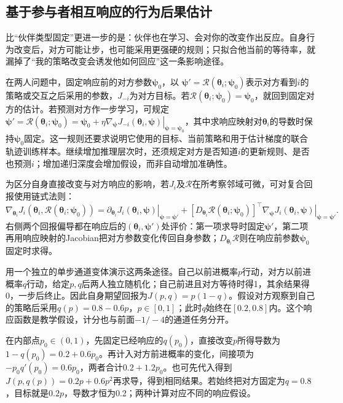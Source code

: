 \subsection{基于参与者相互响应的行为后果估计}
\label{sec:rl-multi-agent-response-model}

比“伙伴类型固定”更进一步的是：伙伴也在学习、会对你的改变作出反应。自身行为改变后，对方可能让步，也可能采用更强硬的规则；只拟合他当前的等待率，就漏掉了“我的策略改变会诱发他如何回应”这一条影响途径。

在两人问题中，固定响应前的对方参数$\bm\psi_0$，以
$\bm\psi'=\mathcal R(\bm\theta_i;\bm\psi_0)$表示对方看到$i$的策略或交互之后采用的参数，$J_{-i}$为对方目标。若$\mathcal R(\bm\theta_i;\bm\psi_0)=\bm\psi_0$，就回到固定对方的估计。若预测对方作一步学习，可规定
$\bm\psi'=\mathcal R(\bm\theta_i;\bm\psi_0)
=\bm\psi_0+\eta\left.\nabla_{\bm\psi}J_{-i}(\bm\theta_i,\bm\psi)\right|_{\bm\psi=\bm\psi_0}$，其中求响应映射对$\bm\theta_i$的导数时保持$\bm\psi_0$固定。这一规则还要求说明它使用的目标、当前策略和用于估计梯度的联合轨迹训练样本。继续增加推理层次时，还须规定对方是否知道$i$的更新规则、是否也预测$i$；增加递归深度会增加假设，而非自动增加准确性。

为区分自身直接改变与对方响应的影响，若$J_i$及$\mathcal R$在所考察邻域可微，可对复合回报使用链式法则：
\begin{equation}
 \nabla_{\bm\theta_i}J_i(\bm\theta_i,\mathcal R(\bm\theta_i;\bm\psi_0))
 =
 \left.\partial_{\bm\theta_i}J_i(\bm\theta_i,\bm\psi)
       \right|_{\bm\psi=\bm\psi'}
 +[D_{\bm\theta_i}\mathcal R(\bm\theta_i;\bm\psi_0)]^\top
 \left.\nabla_{\bm\psi}J_i(\bm\theta_i,\bm\psi)
       \right|_{\bm\psi=\bm\psi'}.
 \label{eq:rl-multi-agent-response-gradient}
\end{equation}
右侧两个回报偏导都在响应后的$(\bm\theta_i,\bm\psi')$处评价：第一项求导时固定$\bm\psi'$，第二项再用响应映射的Jacobian把对方参数变化传回自身参数；$D_{\bm\theta_i}\mathcal R$则在响应前参数$\bm\psi_0$固定时求得。

用一个独立的单步通道变体演示这两条途径。自己以前进概率$p$行动，对方以前进概率$q$行动，给定$p,q$后两人独立随机化；自己前进且对方等待时得1，其余结果得0，一步后终止。因此自身期望回报为$J(p,q)=p(1-q)$。假设对方观察到自己的策略后采用$q(p)=0.8-0.6p$，$p\in[0,1]$；此时$q$始终在$[0.2,0.8]$内。这个响应函数是教学假设，计分也与前面$-1/-4$的通道任务分开。

在内部点$p_0\in(0,1)$，先固定已经响应的$q(p_0)$，直接改变$p$所得导数为$1-q(p_0)=0.2+0.6p_0$。再计入对方前进概率的变化，间接项为$-p_0q'(p_0)=0.6p_0$，两者合计$0.2+1.2p_0$。也可先代入得到$J(p,q(p))=0.2p+0.6p^2$再求导，得到相同结果。若始终把对方固定为$q=0.8$，目标就是$0.2p$，导数才恒为0.2；两种计算对应不同的响应假设。

